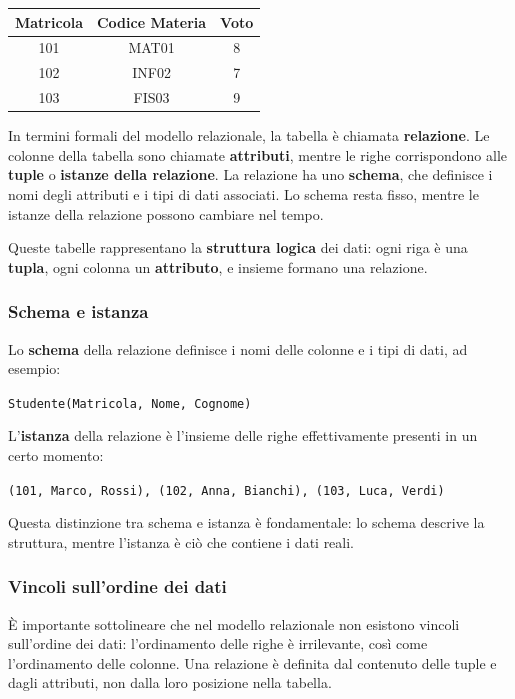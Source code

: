 \documentclass[a4paper,12pt]{article}
\newcommand{\code}[1]{\texttt{#1}}
\begin{document}
\begin{center}
\begin{tabular}{|c|c|c|}
\hline
\textbf{Matricola} & \textbf{Codice Materia} & \textbf{Voto} \\
\hline
101 & MAT01 & 8 \\
102 & INF02 & 7 \\
103 & FIS03 & 9 \\
\hline
\end{tabular}
\end{center}

In termini formali del modello relazionale, la tabella è chiamata \textbf{relazione}.  
Le colonne della tabella sono chiamate \textbf{attributi}, mentre le righe corrispondono alle \textbf{tuple} o \textbf{istanze della relazione}.  
La relazione ha uno \textbf{schema}, che definisce i nomi degli attributi e i tipi di dati associati. Lo schema resta fisso, mentre le istanze della relazione possono cambiare nel tempo.

Queste tabelle rappresentano la \textbf{struttura logica} dei dati: ogni riga è una \textbf{tupla}, ogni colonna un \textbf{attributo}, e insieme formano una relazione.

\subsubsection*{Schema e istanza}

Lo \textbf{schema} della relazione definisce i nomi delle colonne e i tipi di dati, ad esempio:
\begin{center}
\code{Studente(Matricola, Nome, Cognome)}
\end{center}
L'\textbf{istanza} della relazione è l'insieme delle righe effettivamente presenti in un certo momento:
\begin{center}
\code{(101, Marco, Rossi), (102, Anna, Bianchi), (103, Luca, Verdi)}
\end{center}


Questa distinzione tra schema e istanza è fondamentale: lo schema descrive la struttura, mentre l'istanza è ciò che contiene i dati reali.

\subsubsection*{Vincoli sull'ordine dei dati}
È importante sottolineare che nel modello relazionale non esistono vincoli sull'ordine dei dati: 
l'ordinamento delle righe è irrilevante, così come l'ordinamento delle colonne.  
Una relazione è definita dal contenuto delle tuple e dagli attributi, non dalla loro posizione nella tabella.
\end{document}
